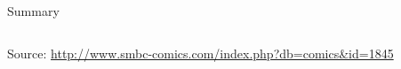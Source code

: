 \begin{frame}{Summary}
\begin{columns}[c]
\begin{column}{0.45\textwidth}
\begin{center}
        \tiny{Source: \url{http://www.smbc-comics.com/index.php?db=comics&id=1845}}
      \end{center}
    \end{column}
  \end{columns}
\end{frame}


